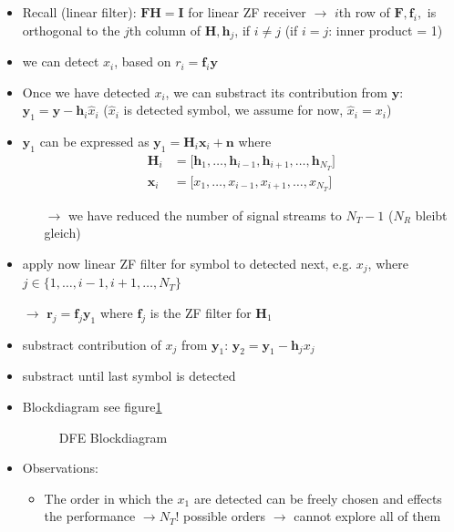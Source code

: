 \documentclass[a4paper, 10pt]{article}
\begin{document}
\begin{itemize}
	\item Recall (linear filter): $\mathbf{FH} = \mathbf{I} $ for linear ZF receiver $\rightarrow$ $i$th row of $\mathbf{F}, \mathbf{f}_i, $ is orthogonal to the $j$th column of $\mathbf{H}, \mathbf{h}_j$, if $ i \neq j$ (if $i = j$: inner product = 1)  
	\item we can detect $x_i$, based on $r_i = \mathbf{f}_i\mathbf{y} $
	\item Once we have detected $x_i$, we can substract its contribution from $\mathbf{y}$: $\mathbf{y}_1 = \mathbf{y} - \mathbf{h}_i\hat{x}_i$ ($\hat{x}_i $ is detected symbol, we assume for now, $\hat{x}_i = x_i $) 
	\item $\mathbf{y}_1 $ can be expressed as $ \mathbf{y}_1 = \mathbf{H}_i\mathbf{x}_i + \mathbf{n}$ where 
	\begin{align*}
		\mathbf{H}_i &= \bigl[\mathbf{h}_1, \dots ,\mathbf{h}_{i-1},\mathbf{h}_{i+1},\dots ,\mathbf{h}_{N_T} \bigr] \\
		\mathbf{x}_i &= \bigl[x_1, \dots , x_{i-1}, x_{i+1}, \dots ,x_{N_T}\bigr]
	\end{align*}
	\begin{itemize}
		\item[$\rightarrow$] we have reduced the number of signal streams to $N_T - 1$ ($N_R $ bleibt gleich)
	\end{itemize}
	\item apply now linear ZF filter for symbol to detected next, e.g. $x_j $, where $ j\in \bigl\{1, \dots ,i - 1, i + 1, \dots , N_T\bigr\} $
	\item[$\rightarrow$] $ \mathbf{r}_j = \mathbf{f}_j\mathbf{y}_1 $ where $\mathbf{f}_j $ is the ZF filter for $\mathbf{H}_1$ 
	\item substract contribution of $x_j $ from $\mathbf{y}_1 $: $\mathbf{y}_2 = \mathbf{y}_1 - \mathbf{h}_j x_j $
	\item substract until last symbol is detected
	\item Blockdiagram see figure\ref{DFE} 
	\begin{figure}[h]
		\centering
		\caption{DFE Blockdiagram}
		\label{DFE}
	\end{figure}
	\item Observations:
	\begin{itemize}
		\item The order in which the $x_1 $ are detected can be freely chosen and effects the performance $\rightarrow  N_T! $ possible orders $\rightarrow$ cannot explore all of them

\end{itemize}
\end{itemize}
\end{document}
